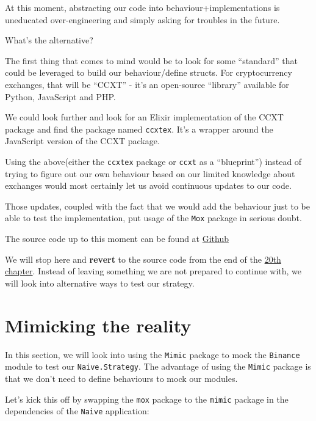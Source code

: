 \documentclass[
  oneside]{book}
\begin{document}
At this moment, abstracting our code into behaviour+implementations is uneducated over-engineering and simply asking for troubles in the future.

What's the alternative?

The first thing that comes to mind would be to look for some ``standard'' that could be leveraged to build our behaviour/define structs. For cryptocurrency exchanges, that will be ``CCXT'' - it's an open-source ``library'' available for Python, JavaScript and PHP.

We could look further and look for an Elixir implementation of the CCXT package and find the package named \texttt{ccxtex}. It's a wrapper around the JavaScript version of the CCXT package.

Using the above(either the \texttt{ccxtex} package or \texttt{ccxt} as a ``blueprint'') instead of trying to figure out our own behaviour based on our limited knowledge about exchanges would most certainly let us avoid continuous updates to our code.

Those updates, coupled with the fact that we would add the behaviour just to be able to test the implementation, put usage of the \texttt{Mox} package in serious doubt.

The source code up to this moment can be found at \href{https://github.com/Cinderella-Man/hands-on-elixir-and-otp-cryptocurrency-trading-bot-source-code/tree/chapter_21_mox}{Github}

We will stop here and \textbf{revert} to the source code from the end of the \href{https://github.com/Cinderella-Man/hands-on-elixir-and-otp-cryptocurrency-trading-bot-source-code/tree/chapter_20}{20th chapter}. Instead of leaving something we are not prepared to continue with, we will look into alternative ways to test our strategy.

\section{Mimicking the reality}\label{mimicking-the-reality}

In this section, we will look into using the \texttt{Mimic} package to mock the \texttt{Binance} module to test our \texttt{Naive.Strategy}. The advantage of using the \texttt{Mimic} package is that we don't need to define behaviours to mock our modules.

Let's kick this off by swapping the \texttt{mox} package to the \texttt{mimic} package in the dependencies of the \texttt{Naive} application:
\end{document}
